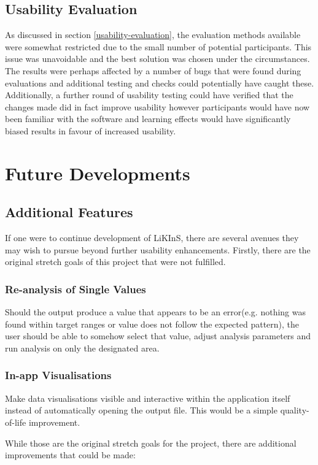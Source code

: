 \documentclass{l4proj}
\begin{document}
\subsection{Usability Evaluation}
As discussed in section \ref{usability-evaluation}, the evaluation methods available were somewhat restricted due to the small number of potential participants. This issue was unavoidable and the best solution was chosen under the circumstances. The results were perhaps affected by a number of bugs that were found during evaluations and additional testing and checks could potentially have caught these. Additionally, a further round of usability testing could have verified that the changes made did in fact improve usability however participants would have now been familiar with the software and learning effects would have significantly biased results in favour of increased usability.


\section{Future Developments}

\subsection{Additional Features}
If one were to continue development of LiKInS, there are several avenues they may wish to pursue beyond further usability enhancements. Firstly, there are the original stretch goals of this project that were not fulfilled.

\subsubsection{Re-analysis of Single Values} Should the output produce a value that appears to be an error(e.g. nothing was found within target ranges or value does not follow the expected pattern), the user should be able to somehow select that value, adjust analysis parameters and run analysis on only the designated area.
\subsubsection{In-app Visualisations}Make data visualisations visible and interactive within the application itself instead of automatically opening the output file. This would be a simple quality-of-life improvement. 


While those are the original stretch goals for the project, there are additional improvements that could be made:
\end{document}
